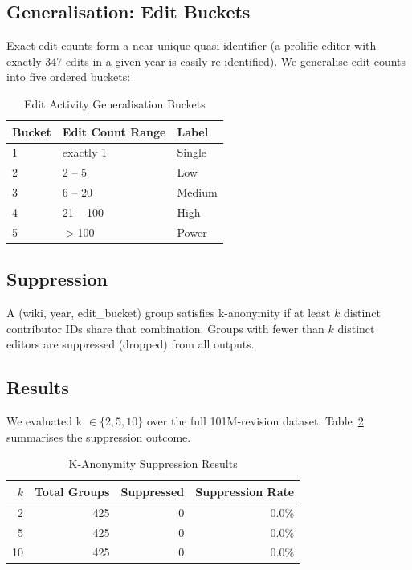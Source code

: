 \documentclass[conference]{IEEEtran}
\begin{document}
\subsection{Generalisation: Edit Buckets}

Exact edit counts form a near-unique quasi-identifier (a prolific editor with exactly 347 edits in a given year is easily re-identified). We generalise edit counts into five ordered buckets:

\begin{table}[htbp]
\caption{Edit Activity Generalisation Buckets}
\label{tab:buckets}
\centering
\begin{tabular}{lll}
\toprule
\textbf{Bucket} & \textbf{Edit Count Range} & \textbf{Label} \\
\midrule
1 & exactly 1   & Single    \\
2 & 2 -- 5      & Low       \\
3 & 6 -- 20     & Medium    \\
4 & 21 -- 100   & High      \\
5 & $>$100      & Power     \\
\bottomrule
\end{tabular}
\end{table}

\subsection{Suppression}

A (wiki, year, edit\_bucket) group satisfies k-anonymity if at least $k$ distinct contributor IDs share that combination. Groups with fewer than $k$ distinct editors are suppressed (dropped) from all outputs.

\subsection{Results}

We evaluated k $\in \{2, 5, 10\}$ over the full 101M-revision dataset. Table~\ref{tab:kanon} summarises the suppression outcome.

\begin{table}[htbp]
\caption{K-Anonymity Suppression Results}
\label{tab:kanon}
\centering
\begin{tabular}{rrrr}
\toprule
$k$ & Total Groups & Suppressed & Suppression Rate \\
\midrule
2  & 425 & 0 & 0.0\% \\
5  & 425 & 0 & 0.0\% \\
10 & 425 & 0 & 0.0\% \\
\bottomrule
\end{tabular}
\end{table}
\end{document}
